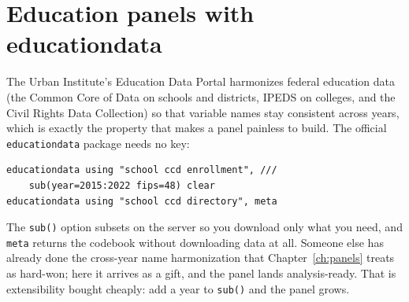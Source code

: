 \documentclass[
    a4paper,
    fontsize=10pt,
    twoside=true,
    numbers=noenddot,
]{kaobook}
\begin{document}
\section{Education panels with educationdata}
The Urban Institute's Education Data Portal harmonizes federal education data (the Common Core of Data on schools and districts, IPEDS on colleges, and the Civil Rights Data Collection) so that variable names stay consistent across years, which is exactly the property that makes a panel painless to build. The official \texttt{educationdata} package needs no key:
{\footnotesize
\begin{verbatim}
educationdata using "school ccd enrollment", ///
    sub(year=2015:2022 fips=48) clear
educationdata using "school ccd directory", meta
\end{verbatim}
}
The \texttt{sub()} option subsets on the server so you download only what you need, and \texttt{meta} returns the codebook without downloading data at all. Someone else has already done the cross-year name harmonization that Chapter~\ref{ch:panels} treats as hard-won; here it arrives as a gift, and the panel lands analysis-ready. That is extensibility bought cheaply: add a year to \texttt{sub()} and the panel grows.
\end{document}
